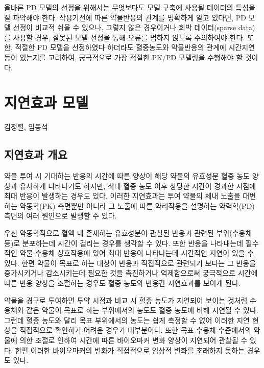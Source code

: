 \documentclass[
  10pt,
  krantz2,
  a4paper]{krantz}
\theoremstyle{definition}
\theoremstyle{definition}
\theoremstyle{definition}
\theoremstyle{remark}
\begin{document}
올바른 PD 모델의 선정을 위해서는 무엇보다도 모델 구축에 사용될 데이터의 특성을 잘 파악해야 한다. 작용기전에 따른 약물반응의 관계를 명확하게 알고 있다면, PD 모델 선정이 비교적 쉬울 수 있으나, 그렇지 않은 경우이거나 희박 데이터(sparse data)를 사용할 경우, 잘못된 모델 선정을 통해 오류를 범하지 않도록 주의하여야 한다. 또한, 적절한 PD 모델을 선정하였다 하더라도 혈중농도와 약물반응의 관계에 시간지연 등이 있는지를 고려하여, 궁극적으로 가장 적절한 PK/PD 모델링을 수행해야 할 것이다.

\hypertarget{delayed-effect}{%
\chapter{지연효과 모델}\label{delayed-effect}}

김정렬, 임동석

\hypertarget{uxc9c0uxc5f0uxd6a8uxacfc-uxac1cuxc694}{%
\section{지연효과 개요}\label{uxc9c0uxc5f0uxd6a8uxacfc-uxac1cuxc694}}

약물 투여 시 기대하는 반응의 시간에 따른 양상이 해당 약물의 유효성분 혈중 농도 양상과 유사하게 나타나기도 하지만, 최대 혈중 농도 이후 상당한 시간이 경과한 시점에 최대 반응이 발생하는 경우도 있다. 이러한 지연효과는 투여 약물의 체내 노출을 대변하는 약동학(PK) 측면뿐만 아니라 그 노출에 따른 약리작용을 설명하는 약력학(PD) 측면의 여러 원인으로 발생할 수 있다.

우선 약동학적으로 혈액 내 존재하는 유효성분이 관찰된 반응과 관련된 부위(수용체 등)로 분포하는데 시간이 걸리는 경우를 생각할 수 있다. 또한 반응을 나타내는데 필수적인 약물-수용체 상호작용에 있어 최대 반응이 나타나는데 시간적인 지연이 있을 수 있다. 한편 약물이 목표로 하는 대상이 반응과 직접적으로 관련되기 보다는 그 반응을 증가시키거나 감소시키는데 필요한 것을 촉진하거나 억제함으로써 궁극적으로 시간에 따른 반응 양상을 조절하는 경우도 혈중 농도와 반응간 지연효과를 보이게 된다.

약물을 경구로 투여하면 투약 시점과 비교 시 혈중 농도가 지연되어 보이는 것처럼 수용체와 같은 약물이 목표로 하는 부위에서의 농도도 혈중 농도에 비해 지연될 수 있다. 그런데 혈중 농도와 달리 목표 부위에서의 농도는 쉽게 측정할 수 없어 이러한 지연 현상을 직접적으로 확인하기 어려운 경우가 대부분이다. 또한 목표 수용체 수준에서의 약물에 의한 조절로 인하여 시간에 따른 바이오마커 변화 양상이 지연되어 관찰될 수 있다. 한편 이러한 바이오마커의 변화가 직접적으로 임상적 변화를 초래하지 못하는 경우도 있다.
\end{document}
